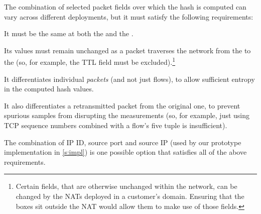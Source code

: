 

The combination of selected packet fields over which the hash is computed can vary across different deployments, but it must satisfy the following requirements: 

 It must be the same at both the \inbox and the \outbox.

 Its values must remain unchanged as a packet traverses the network from the \inbox to the \outbox (so, for example, the TTL field must be excluded).\footnote{Certain fields, that are otherwise unchanged within the network, can be changed by the NATs deployed in a customer's domain. Ensuring that the \name boxes sit outside the NAT would allow them to make use of those fields.} 

 It differentiates individual \emph{packets} (and not just flows), to allow sufficient entropy in the computed hash values.

 It also differentiates a retransmitted packet from the original one, to prevent spurious samples from disrupting the measurements (so, for example, just using TCP sequence numbers combined with a flow's five tuple is insufficient).

The combination of IP ID, source port and source IP (used by our prototype implementation in \ref{s:impl}) is one possible option that satisfies all of the above requirements.  

